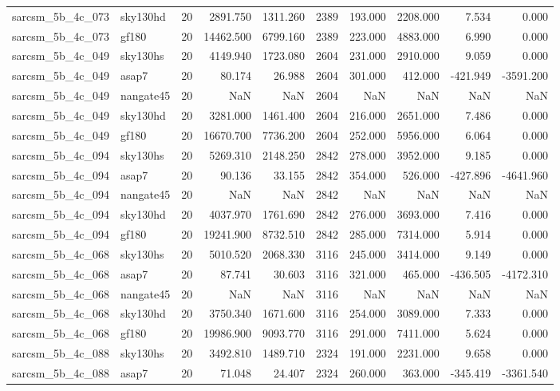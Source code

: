 \begin{tabular}{llrrrrrrrr}
sarcsm\_5b\_4c\_073 & sky130hd & 20 & 2891.750 & 1311.260 & 2389 & 193.000 & 2208.000 & 7.534 & 0.000 \\
sarcsm\_5b\_4c\_073 & gf180 & 20 & 14462.500 & 6799.160 & 2389 & 223.000 & 4883.000 & 6.990 & 0.000 \\
sarcsm\_5b\_4c\_049 & sky130hs & 20 & 4149.940 & 1723.080 & 2604 & 231.000 & 2910.000 & 9.059 & 0.000 \\
sarcsm\_5b\_4c\_049 & asap7 & 20 & 80.174 & 26.988 & 2604 & 301.000 & 412.000 & -421.949 & -3591.200 \\
sarcsm\_5b\_4c\_049 & nangate45 & 20 & NaN & NaN & 2604 & NaN & NaN & NaN & NaN \\
sarcsm\_5b\_4c\_049 & sky130hd & 20 & 3281.000 & 1461.400 & 2604 & 216.000 & 2651.000 & 7.486 & 0.000 \\
sarcsm\_5b\_4c\_049 & gf180 & 20 & 16670.700 & 7736.200 & 2604 & 252.000 & 5956.000 & 6.064 & 0.000 \\
sarcsm\_5b\_4c\_094 & sky130hs & 20 & 5269.310 & 2148.250 & 2842 & 278.000 & 3952.000 & 9.185 & 0.000 \\
sarcsm\_5b\_4c\_094 & asap7 & 20 & 90.136 & 33.155 & 2842 & 354.000 & 526.000 & -427.896 & -4641.960 \\
sarcsm\_5b\_4c\_094 & nangate45 & 20 & NaN & NaN & 2842 & NaN & NaN & NaN & NaN \\
sarcsm\_5b\_4c\_094 & sky130hd & 20 & 4037.970 & 1761.690 & 2842 & 276.000 & 3693.000 & 7.416 & 0.000 \\
sarcsm\_5b\_4c\_094 & gf180 & 20 & 19241.900 & 8732.510 & 2842 & 285.000 & 7314.000 & 5.914 & 0.000 \\
sarcsm\_5b\_4c\_068 & sky130hs & 20 & 5010.520 & 2068.330 & 3116 & 245.000 & 3414.000 & 9.149 & 0.000 \\
sarcsm\_5b\_4c\_068 & asap7 & 20 & 87.741 & 30.603 & 3116 & 321.000 & 465.000 & -436.505 & -4172.310 \\
sarcsm\_5b\_4c\_068 & nangate45 & 20 & NaN & NaN & 3116 & NaN & NaN & NaN & NaN \\
sarcsm\_5b\_4c\_068 & sky130hd & 20 & 3750.340 & 1671.600 & 3116 & 254.000 & 3089.000 & 7.333 & 0.000 \\
sarcsm\_5b\_4c\_068 & gf180 & 20 & 19986.900 & 9093.770 & 3116 & 291.000 & 7411.000 & 5.624 & 0.000 \\
sarcsm\_5b\_4c\_088 & sky130hs & 20 & 3492.810 & 1489.710 & 2324 & 191.000 & 2231.000 & 9.658 & 0.000 \\
sarcsm\_5b\_4c\_088 & asap7 & 20 & 71.048 & 24.407 & 2324 & 260.000 & 363.000 & -345.419 & -3361.540 \\

\end{tabular}
